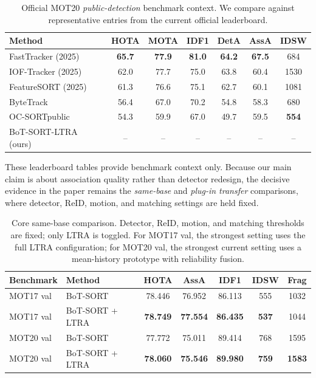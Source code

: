 \begin{table}[t]
\centering
\caption{Official MOT20 \emph{public-detection} benchmark context. We compare against representative entries from the current official leaderboard.}
\label{tab:mot20_context}
\begin{tabular}{lcccccc}
\toprule
Method & HOTA & MOTA & IDF1 & DetA & AssA & IDSW \\
\midrule
FastTracker (2025) & \textbf{65.7} & \textbf{77.9} & \textbf{81.0} & \textbf{64.2} & \textbf{67.5} & 684 \\
IOF-Tracker (2025) & 62.0 & 77.7 & 75.0 & 63.8 & 60.4 & 1530 \\
FeatureSORT (2025) & 61.3 & 76.6 & 75.1 & 62.7 & 60.1 & 1081 \\
ByteTrack \cite{zhang2021bytetrack} & 56.4 & 67.0 & 70.2 & 54.8 & 58.3 & 680 \\
OC-SORTpublic \cite{cao2022ocsort} & 54.3 & 59.9 & 67.0 & 49.7 & 59.5 & \textbf{554} \\
BoT-SORT-LTRA (ours) & -- & -- & -- & -- & -- & -- \\
\bottomrule
\end{tabular}
\end{table}

These leaderboard tables provide benchmark context only. Because our main claim is about association quality rather than detector redesign, the decisive evidence in the paper remains the \emph{same-base} and \emph{plug-in transfer} comparisons, where detector, ReID, motion, and matching settings are held fixed.

\begin{table}[t]
\centering
\caption{Core same-base comparison. Detector, ReID, motion, and matching thresholds are fixed; only LTRA is toggled. For MOT17 val, the strongest setting uses the full LTRA configuration; for MOT20 val, the strongest current setting uses a mean-history prototype with reliability fusion.}
\label{tab:same_base}
\begin{tabular}{llccccc}
\toprule
Benchmark & Method & HOTA & AssA & IDF1 & IDSW & Frag \\
\midrule
MOT17 val & BoT-SORT & 78.446 & 76.952 & 86.113 & 555 & 1032 \\
MOT17 val & BoT-SORT + LTRA & \textbf{78.749} & \textbf{77.554} & \textbf{86.435} & \textbf{537} & 1044 \\
MOT20 val & BoT-SORT & 77.772 & 75.011 & 89.414 & 768 & 1595 \\
MOT20 val & BoT-SORT + LTRA & \textbf{78.060} & \textbf{75.546} & \textbf{89.980} & \textbf{759} & \textbf{1583} \\
\bottomrule
\end{tabular}
\end{table}

